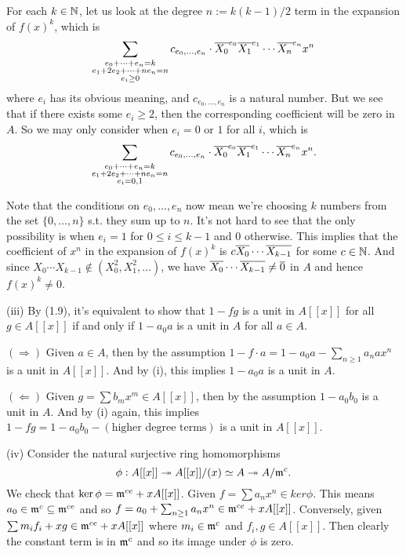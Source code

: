 \documentclass[../A&M.tex]{subfiles}
\begin{document}
For each $k\in\mathbb{N}$, let us look at the degree $n:=k(k-1)/2$ term in the expansion of $f(x)^k$, which is
$$
\sum_{\substack{ e_0+\cdots+e_n = k \\ e_1+2e_2+\cdots+ne_n = n \\ e_i\geq0 }} c_{e_0,\ldots,e_n} \cdot \overline{X_0}^{e_0} \overline{X_1}^{e_1} \cdots \overline{X_n}^{e_n} x^n
$$
where $e_i$ has its obvious meaning, and $c_{e_0,\ldots,e_n}$ is a natural number. But we see that if there exists some $e_i\geq 2$, then the corresponding coefficient will be zero in $A$. So we may only consider when $e_i=0$ or $1$ for all $i$, which is
$$
\sum_{\substack{ e_0+\cdots+e_n = k \\ e_1+2e_2+\cdots+ne_n = n \\ e_i=0,1 }} c_{e_0,\ldots,e_n} \cdot \overline{X_0}^{e_0} \overline{X_1}^{e_1} \cdots \overline{X_n}^{e_n} x^n.
$$

Note that the conditions on $e_0,\ldots,e_n$ now mean we're choosing $k$ numbers from the set $\{0,\ldots,n\}$ s.t. they sum up to $n$. It's not hard to see that the only possibility is when $e_i=1$ for $0 \leq i \leq k-1$ and $0$ otherwise. This implies that the coefficient of $x^n$ in the expansion of $f(x)^k$ is $c\overline{X_0}\cdots\overline{X_{k-1}}$ for some $c\in\mathbb{N}$. And since $X_0\cdots X_{k-1} \not\in (X_0^2,X_1^2,\ldots)$, we have $\overline{X_0}\cdots\overline{X_{k-1}} \neq \overline{0}$ in $A$ and hence $f(x)^k\neq0$.

(iii) By (1.9), it's equivalent to show that $1-fg$ is a unit in $A[[x]]$ for all $g\in A[[x]]$ if and only if $1-a_0a$ is a unit in $A$ for all $a\in A$.

$(\Rightarrow)$ Given $a\in A$, then by the assumption $1-f\cdot a = 1 - a_0a - \sum_{n\geq1} a_nax^n$ is a unit in $A[[x]]$. And by (i), this implies $1-a_0a$ is a unit in $A$.

$(\Leftarrow)$ Given $g=\sum b_mx^m \in A[[x]]$, then by the assumption $1-a_0b_0$ is a unit in $A$. And by (i) again, this implies $1-fg = 1-a_0b_0 - (\text{higher degree terms})$ is a unit in $A[[x]]$.

(iv) Consider the natural surjective ring homomorphisms
$$
\phi: A[[x]] \twoheadrightarrow A[[x]]/(x) \simeq A \twoheadrightarrow A/\mathfrak{m}^c.
$$
We check that $\ker\phi = \mathfrak{m}^{ce} + xA[[x]]$. Given $f=\sum a_nx^n \in ker\phi$. This means $a_0 \in \mathfrak{m}^c \subseteq \mathfrak{m}^{ce}$ and so $f = a_0 + \sum_{n\geq1} a_nx^n \in \mathfrak{m}^{ce} + xA[[x]]$. Conversely, given $\sum m_if_i + xg \in \mathfrak{m}^{ce} + xA[[x]]$ where $m_i\in\mathfrak{m}^c$ and $f_i,g \in A[[x]]$. Then clearly the constant term is in $\mathfrak{m}^c$ and so its image under $\phi$ is zero.
\end{document}
